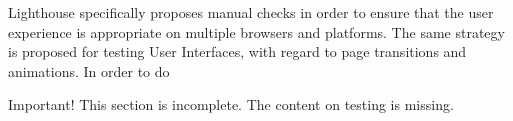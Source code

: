 Lighthouse specifically proposes manual checks in order to ensure that the user experience is appropriate on multiple browsers and platforms. The same strategy is proposed for testing User Interfaces, with regard to page transitions and animations. 
In order to do 

\begin{bclogo}[logo=\bcattention, couleurBarre=red, noborder=true, 
               couleur=LightSalmon]{Important!}
This section is incomplete. The content on testing is missing.
\end{bclogo}
\newpage
